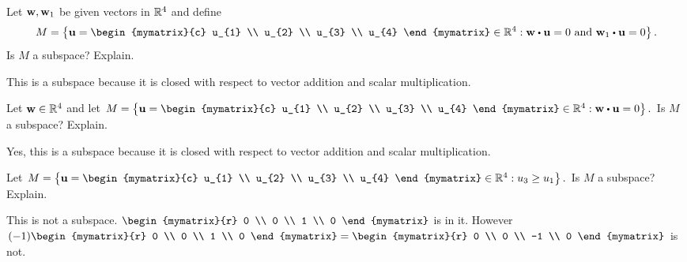\begin{enumialphparenastyle}
\begin{ex} Let ${\bf w},{\bf w}_{1}$ be given vectors in $\mathbb{R}^{4}$ and define 
\begin{equation*}
M=\left\{ \vect{u}=\begin{mymatrix}{c}
u_{1} \\
u_{2} \\
u_{3} \\
u_{4}
\end{mymatrix} \in \R
^{4}:\vect{w}\dotprod \vect{u}=0\text{ and }\vect{w}_{1}\dotprod \vect{u}=0\right\}
.
\end{equation*}
Is $M$ a subspace? Explain.
\begin{sol}
This is a subspace because it is closed
with respect to vector addition and scalar multiplication.
\end{sol}
\end{ex}


\begin{ex} Let ${\bf w}\in \mathbb{R}^{4}$ and let $M=\left\{ \vect{u}
=\begin{mymatrix}{c}
u_{1} \\
u_{2} \\
u_{3} \\
u_{4}
\end{mymatrix} \in \R^{4}:\vect{w}\dotprod \vect{u}
=0\right\} .$ Is $M$ a subspace? Explain.
\begin{sol}
Yes, this is a subspace because it is closed with respect to vector addition and scalar multiplication.
\end{sol}
\end{ex}

\begin{ex} Let $M=\left\{ \vect{u}=\begin{mymatrix}{c}
u_{1} \\
u_{2} \\
u_{3} \\
u_{4}
\end{mymatrix} \in 
\R^{4}:u_{3}\geq u_{1}\right\} .$ Is $M$ a subspace? Explain.
\begin{sol}
This
is not a subspace. $\begin{mymatrix}{r}
0 \\
0 \\
1 \\
0
\end{mymatrix} $ is in it. However $(-1) \begin{mymatrix}{r}
0 \\
0 \\
1 \\
0
\end{mymatrix}  = \begin{mymatrix}{r}
0 \\
0 \\
-1 \\
0
\end{mymatrix} $ is not.
\end{sol}
\end{ex}


\end{enumialphparenastyle}
